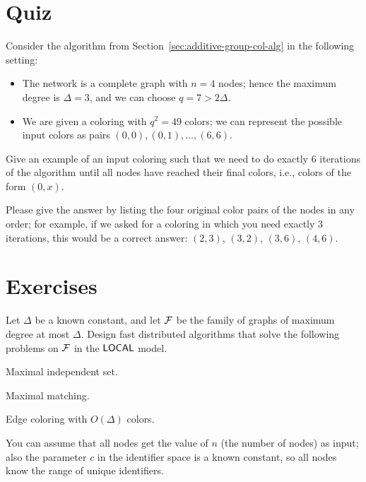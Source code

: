 \section{Quiz}

Consider the algorithm from Section~\ref{sec:additive-group-col-alg} in the following setting:
\begin{itemize}[noitemsep]
    \item The network is a complete graph with $n = 4$ nodes; hence the maximum degree is $\Delta = 3$, and we can choose $q = 7 > 2\Delta$.
    \item We are given a coloring with $q^2 = 49$ colors; we can represent the possible input colors as pairs $(0,0),\allowbreak (0,1),\allowbreak \dotsc,\allowbreak (6,6)$.
\end{itemize}
Give an example of an input coloring such that we need to do exactly $6$ iterations of the algorithm until all nodes have reached their final colors, i.e., colors of the form $(0,x)$.

Please give the answer by listing the four original color pairs of the nodes in any order; for example, if we asked for a coloring in which you need exactly 3 iterations, this would be a correct answer: $(2, 3)$, $(3, 2)$, $(3, 6)$, $(4, 6)$.

\section{Exercises}

\begin{ex}[applications]
    Let $\Delta$ be a known constant, and let $\mathcal{F}$ be the family of graphs of maximum degree at most $\Delta$. Design fast distributed algorithms that solve the following problems on $\mathcal{F}$ in the $\textup{\sffamily LOCAL}$ model.
    \begin{subex}
        \item Maximal independent set.
        \item Maximal matching.
        \item Edge coloring with $O(\Delta)$ colors.
    \end{subex}
    You can assume that all nodes get the value of $n$ (the number of nodes) as input; also the parameter $c$ in the identifier space is a known constant, so all nodes know the range of unique identifiers.
\end{ex}

